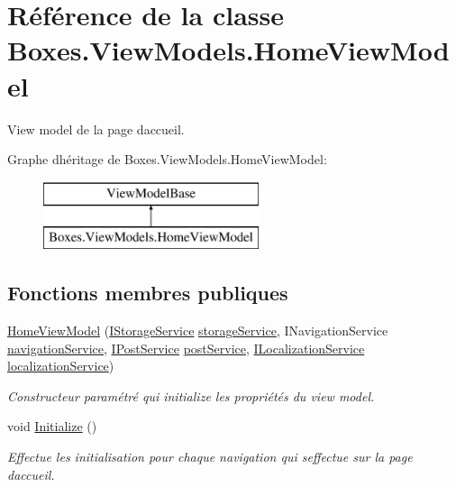 \hypertarget{class_boxes_1_1_view_models_1_1_home_view_model}{}\section{Référence de la classe Boxes.\+View\+Models.\+Home\+View\+Model}
\label{class_boxes_1_1_view_models_1_1_home_view_model}


View model de la page d\textquotesingle{}accueil.  


Graphe d\textquotesingle{}héritage de Boxes.\+View\+Models.\+Home\+View\+Model\+:\begin{figure}[H]
\begin{center}
\leavevmode
\includegraphics[height=2.000000cm]{class_boxes_1_1_view_models_1_1_home_view_model}
\end{center}
\end{figure}
\subsection*{Fonctions membres publiques}
\begin{DoxyCompactItemize}
\item 
\hyperlink{class_boxes_1_1_view_models_1_1_home_view_model_a9db727ef80ccce02d79fa5977a7cbac6}{Home\+View\+Model} (\hyperlink{interface_boxes_1_1_services_1_1_storage_1_1_i_storage_service}{I\+Storage\+Service} \hyperlink{class_boxes_1_1_view_models_1_1_home_view_model_a3bd6b9be9afed71066aeb39291b2aaa4}{storage\+Service}, I\+Navigation\+Service \hyperlink{class_boxes_1_1_view_models_1_1_home_view_model_ae5517d2f2f0bf741514a370425c99fcb}{navigation\+Service}, \hyperlink{interface_boxes_1_1_services_1_1_post_1_1_i_post_service}{I\+Post\+Service} \hyperlink{class_boxes_1_1_view_models_1_1_home_view_model_adeb2bc8d9cb82fee7f93583f5901ba79}{post\+Service}, \hyperlink{interface_boxes_1_1_services_1_1_localization_1_1_i_localization_service}{I\+Localization\+Service} \hyperlink{class_boxes_1_1_view_models_1_1_home_view_model_a929f17c774ad92cff26b39e3f35812c6}{localization\+Service})
\begin{DoxyCompactList}\small\item\em Constructeur paramétré qui initialize les propriétés du view model. \end{DoxyCompactList}\item 
void \hyperlink{class_boxes_1_1_view_models_1_1_home_view_model_ac47f26b6394b7c9eaa728e0dc7a87c9f}{Initialize} ()
\begin{DoxyCompactList}\small\item\em Effectue les initialisation pour chaque navigation qui s\textquotesingle{}effectue sur la page d\textquotesingle{}accueil. \end{DoxyCompactList}\end{DoxyCompactItemize}
